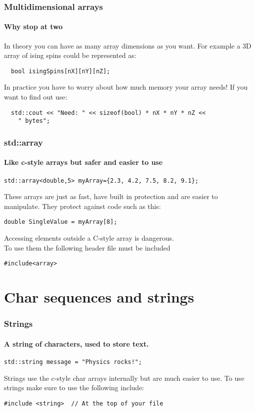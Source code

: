 \documentclass{beamer}
\begin{document}
\begin{frame}[fragile]
  \frametitle{Multidimensional arrays}
  \framesubtitle{Why stop at two}
  In theory you can have as many array dimensions as you want.  For example a 3D array of ising spins could be represented as:
  \begin{lstlisting}
  bool isingSpins[nX][nY][nZ];
  \end{lstlisting}
  In practice you have to worry about how much memory your array needs!\pause{}  If you want to find out use:
  \begin{lstlisting}
  std::cout << "Need: " << sizeof(bool) * nX * nY * nZ <<
    " bytes";
  \end{lstlisting}

\end{frame}

\begin{frame}[fragile]
	\frametitle{std::array}
	\framesubtitle{Like c-style arrays but safer and easier to use}
	\begin{lstlisting}
std::array<double,5> myArray={2.3, 4.2, 7.5, 8.2, 9.1};
	\end{lstlisting}
	These arrays are just as fast, have built in protection and are easier to manipulate. They protect against code such as this:
	\begin{lstlisting}
double SingleValue = myArray[8];
	\end{lstlisting}
	Accessing elements outside a C-style array is dangerous.\\
	To use them the following header file must be included
	\begin{lstlisting}
#include<array>
	\end{lstlisting}
\end{frame}

\section{Char sequences and strings}


\begin{frame}[fragile]
  \frametitle{Strings}
  \framesubtitle{A string of characters, used to store text.}
  
  \begin{lstlisting}
std::string message = "Physics rocks!";
  \end{lstlisting}
  Strings use the c-style char arrays internally but are much easier to use.
  To use strings make sure to use the following include:
  \begin{lstlisting}
#include <string>  // At the top of your file
  \end{lstlisting}
\end{frame}
\end{document}
